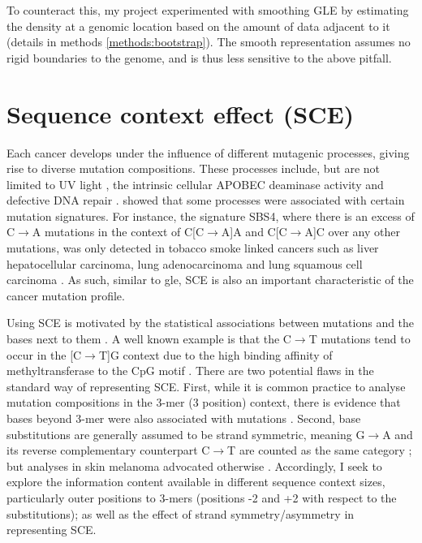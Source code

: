 To counteract this, my project experimented with smoothing GLE by estimating the \gls{density} at a genomic location based on the amount of data adjacent to it (details in methods \ref{methods:bootstrap}). The smooth representation assumes no rigid boundaries to the genome, and is thus less sensitive to the above pitfall. 



\section{Sequence context effect (SCE)}
\label{intro:sce}

Each cancer develops under the influence of different mutagenic processes, giving rise to diverse mutation compositions. These processes include, but are not limited to UV light \citep[known to drive skin melanoma;][]{Mohania2017}, the intrinsic cellular APOBEC deaminase activity \citep[\textit{e.g.} in B cells;][]{Kuppers2005MechanismsPathogenesis} and defective DNA repair \citep[\textit{e.g.} mutated \textit{BRCA} genes in breast cancer;][]{Navasardyan2021YY1TNBC}. \citet{Alexandrov2013, Alexandrov2020} showed that some processes were associated with certain mutation signatures. For instance, the signature SBS4, where there is an excess of C$\rightarrow$A mutations in the context of C[C$\rightarrow$A]A and C[C$\rightarrow$A]C over any other mutations, was only detected in tobacco smoke linked cancers such as liver hepatocellular carcinoma, lung adenocarcinoma and lung squamous cell carcinoma \citep{Alexandrov2020}. As such, similar to \gls{gle}, SCE is also an important characteristic of the cancer mutation profile. 

Using SCE is motivated by the statistical associations between mutations and the \glspl{base} next to them \citep{Zhu2017}. A well known example is that the C$\rightarrow$T mutations tend to occur in the [C$\rightarrow$T]G context due to the high binding affinity of methyltransferase to the CpG motif \citep[Figure \ref{fig:motif_demo}][]{Cooper2010}. There are two potential flaws in the standard way of representing SCE. First, while it is common practice to analyse mutation compositions in the 3-mer (3 position) context, there is evidence that bases beyond 3-mer were also associated with mutations \citep{Zhu2017,Zhu2020}. Second, base substitutions are generally assumed to be strand symmetric, meaning G$\rightarrow$A and its reverse complementary counterpart C$\rightarrow$T are counted as the same category \citep[Figure \ref{fig:motif_symmetric_demo};][]{Alexandrov2013, Jiao2020}; but analyses in skin melanoma advocated otherwise \citep{Zhu2017}. Accordingly, I seek to explore the information content available in different sequence context sizes, particularly outer positions to 3-mers (positions -2 and +2 with respect to the substitutions); as well as the effect of strand symmetry/asymmetry in representing SCE.

